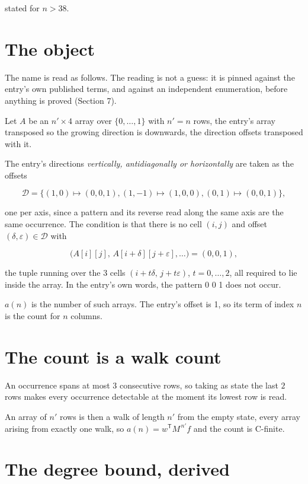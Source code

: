 \documentclass[11pt]{article}
\theoremstyle{definition}
\begin{document}
stated for $n > 38$.

\section{The object}

The name is read as follows. The reading is not a guess: it is pinned against the entry's own published terms, and against an independent enumeration, before anything is proved (Section 7).

Let $A$ be an $n' \times 4$ array over $\{0,\dots,1\}$ with $n' = n$ rows, the entry's array transposed so the growing direction is downwards, the direction offsets transposed with it.

The entry's directions {\itshape vertically, antidiagonally or horizontally} are taken as the offsets

\[\mathcal{D} = \{(1,0)\mapsto(0,0,1), (1,-1)\mapsto(1,0,0), (0,1)\mapsto(0,0,1)\},\]

one per axis, since a pattern and its reverse read along the same axis are the same occurrence. The condition is that there is no cell $(i,j)$ and offset $(\delta,\varepsilon)\in\mathcal{D}$ with

\[\bigl(A[i][j],\,A[i{+}\delta][j{+}\varepsilon],\dots\bigr) = (0, 0, 1),\]

the tuple running over the $3$ cells $(i+t\delta,\,j+t\varepsilon)$, $t = 0,\dots,2$, all required to lie inside the array. In the entry's own words, the pattern 0 0 1 does not occur.

$a(n)$ is the number of such arrays. The entry's offset is 1, so its term of index $n$ is the count for $n$ columns.

\section{The count is a walk count}

An occurrence spans at most $3$ consecutive rows, so taking as state the last $2$ rows makes every occurrence detectable at the moment its lowest row is read.

An array of $n'$ rows is then a walk of length $n'$ from the empty state, every array arising from exactly one walk, so $a(n) = w^{\mathsf T}M^{\,n'}f$ and the count is C-finite.

\section{The degree bound, derived}
\end{document}
